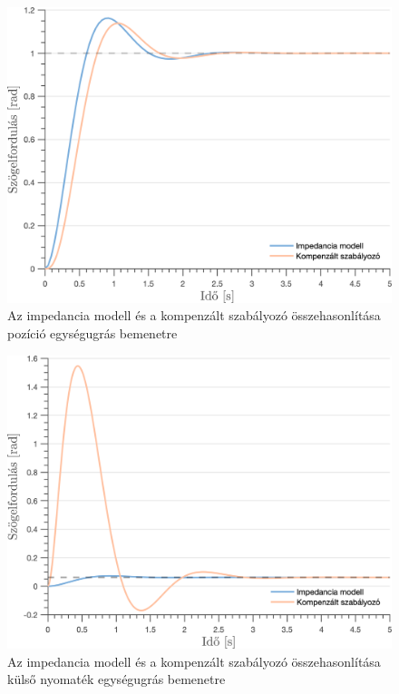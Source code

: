 \begin{figure}[ht]
    \begin{center}
    \includegraphics[width=\textwidth]{images/observer_controller_pos_resp_direct_comp.png}
    \caption{Az impedancia modell és a kompenzált szabályozó összehasonlítása pozíció egységugrás bemenetre}\label{fig:observer_controller_pos_resp_direct}
    \end{center}
\end{figure}

\begin{figure}[ht]
    \begin{center}
    \includegraphics[width=\textwidth]{images/observer_controller_torque_resp_direct_comp.png}
    \caption{Az impedancia modell és a kompenzált szabályozó összehasonlítása külső nyomaték egységugrás bemenetre}\label{fig:observer_controller_torque_resp_direct}
    \end{center}
\end{figure}

